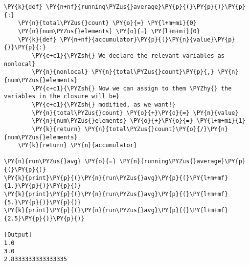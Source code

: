 \begin{Verbatim}[label=\makebox{\url{https://github.com/lucabaldini/cmepda/tree/master/slides/latex/snippets/closure\_right.py}},commandchars=\\\{\}]
\PY{k}{def} \PY{n+nf}{running\PYZus{}average}\PY{p}{(}\PY{p}{)}\PY{p}{:}
    \PY{n}{total\PYZus{}count} \PY{o}{=} \PY{l+m+mi}{0}
    \PY{n}{num\PYZus{}elements} \PY{o}{=} \PY{l+m+mi}{0}
    \PY{k}{def} \PY{n+nf}{accumulator}\PY{p}{(}\PY{n}{value}\PY{p}{)}\PY{p}{:}
        \PY{c+c1}{\PYZsh{} We declare the relevant variables as nonlocal}
        \PY{n}{nonlocal} \PY{n}{total\PYZus{}count}\PY{p}{,} \PY{n}{num\PYZus{}elements}
        \PY{c+c1}{\PYZsh{} Now we can assign to them \PYZhy{} the variables in the closure will be}
        \PY{c+c1}{\PYZsh{} modified, as we want!}
        \PY{n}{total\PYZus{}count} \PY{o}{+}\PY{o}{=} \PY{n}{value}
        \PY{n}{num\PYZus{}elements} \PY{o}{+}\PY{o}{=} \PY{l+m+mi}{1}
        \PY{k}{return} \PY{n}{total\PYZus{}count}\PY{o}{/}\PY{n}{num\PYZus{}elements}
    \PY{k}{return} \PY{n}{accumulator}
    
\PY{n}{run\PYZus{}avg} \PY{o}{=} \PY{n}{running\PYZus{}average}\PY{p}{(}\PY{p}{)}
\PY{k}{print}\PY{p}{(}\PY{n}{run\PYZus{}avg}\PY{p}{(}\PY{l+m+mf}{1.}\PY{p}{)}\PY{p}{)}
\PY{k}{print}\PY{p}{(}\PY{n}{run\PYZus{}avg}\PY{p}{(}\PY{l+m+mf}{5.}\PY{p}{)}\PY{p}{)}
\PY{k}{print}\PY{p}{(}\PY{n}{run\PYZus{}avg}\PY{p}{(}\PY{l+m+mf}{2.5}\PY{p}{)}\PY{p}{)}

[Output]
1.0
3.0
2.8333333333333335
\end{Verbatim}